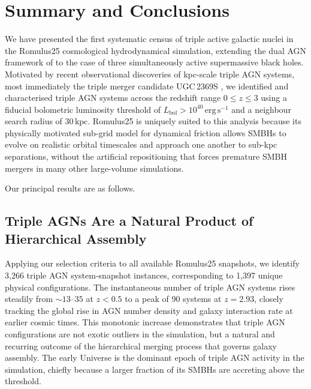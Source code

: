 \documentclass[twocolumn, 10pt]{article}
\begin{document}
\clearpage

\section{Summary and Conclusions}
\label{sec:conclusions}

We have presented the first systematic census of triple active
galactic nuclei in the Romulus25 cosmological hydrodynamical
simulation, extending the dual AGN framework of
\citet{Saeedzadeh2024} to the case of three simultaneously active
supermassive black holes. Motivated by recent observational
discoveries of kpc-scale triple AGN systems, most immediately
the triple merger candidate UGC\,2369S \citep{Ding2025}, we
identified and characterised triple AGN systems across the redshift
range $0 \leq z \leq 3$ using a fiducial bolometric luminosity
threshold of $L_\mathrm{bol} > 10^{40}\,\mathrm{erg\,s^{-1}}$ and
a neighbour search radius of $30\,\mathrm{kpc}$. Romulus25 is
uniquely suited to this analysis because its physically motivated
sub-grid model for dynamical friction allows SMBHs to evolve on
realistic orbital timescales and approach one another to sub-kpc
separations, without the artificial repositioning that forces
premature SMBH mergers in many other large-volume simulations.

Our principal results are as follows.

\subsection*{Triple AGNs Are a Natural Product of Hierarchical
Assembly}

Applying our selection criteria to all available Romulus25 snapshots,
we identify 3,266 triple AGN system-snapshot instances, corresponding
to 1,397 unique physical configurations. The instantaneous number of
triple AGN systems rises steadily from $\sim 13$--$35$ at $z < 0.5$
to a peak of 90 systems at $z = 2.93$, closely tracking the global
rise in AGN number density and galaxy interaction rate at earlier
cosmic times. This monotonic increase demonstrates that triple AGN
configurations are not exotic outliers in the simulation, but a
natural and recurring outcome of the hierarchical merging process
that governs galaxy assembly. The early Universe is the dominant epoch of triple AGN activity in
the simulation, chiefly because a larger fraction of its SMBHs are
accreting above the threshold.
\end{document}
